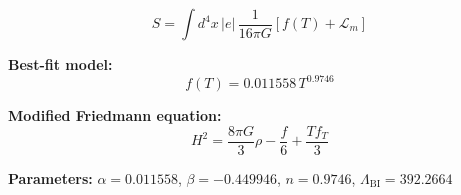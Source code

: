 
\begin{equation}
  S = \int d^4x \, |e| \, \frac{1}{16\pi G} \left[ f(T) + \mathcal{L}_m \right]
\end{equation}

\textbf{Best-fit model:}
\begin{equation}
  f(T) = 0.011558 \, T^{0.9746}
\end{equation}

\textbf{Modified Friedmann equation:}
\begin{equation}
  H^2 = \frac{8\pi G}{3} \rho - \frac{f}{6} + \frac{T f_T}{3}
\end{equation}

\textbf{Parameters:}
$\alpha = 0.011558$, \quad
$\beta = -0.449946$, \quad
$n = 0.9746$, \quad
$\Lambda_{\text{BI}} = 392.2664$